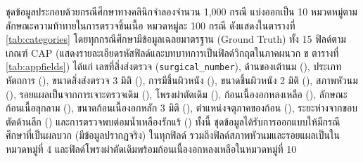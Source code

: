 ชุดข้อมูลประกอบด้วยกรณีศึกษาทางคลินิกจำลองจำนวน 1,000 กรณี แบ่งออกเป็น 10 หมวดหมู่ตามลักษณะความท้าทายในการตรวจชิ้นเนื้อ หมวดหมู่ละ 100 กรณี ดังแสดงในตารางที่ \ref{tab:categories} โดยทุกกรณีศึกษามีข้อมูลเฉลยมาตรฐาน (Ground Truth) ทั้ง 15 ฟิลด์ตามเกณฑ์ CAP \cite{cap_breast} (แสดงรายละเอียดรหัสฟิลด์และบทบาทการเป็นฟิลด์วิกฤตในภาคผนวก ข ตารางที่ \ref{tab:appfields}) ได้แก่ เลขที่สิ่งส่งตรวจ (\texttt{surgical\_number}), ด้านของเต้านม (), ประเภทหัตถการ (), ขนาดสิ่งส่งตรวจ 3 มิติ (), การมีชิ้นผิวหนัง (), ขนาดชิ้นผิวหนัง 2 มิติ (), สภาพหัวนม (), รอยแผลเป็นจากการเจาะตรวจเดิม (), โพรงผ่าตัดเดิม (), ก้อนเนื้องอกหลงเหลือ (), ลักษณะก้อนเนื้อลุกลาม (), ขนาดก้อนเนื้องอกหลัก 3 มิติ (), ตำแหน่งจตุภาคของก้อน (), ระยะห่างจากขอบตัดด้านลึก () และการตรวจพบต่อมน้ำเหลืองรักแร้ () ทั้งนี้ ชุดข้อมูลได้รับการออกแบบให้มีกรณีศึกษาที่เป็นผลบวก (มีข้อมูลปรากฏจริง) ในทุกฟิลด์ รวมถึงฟิลด์สภาพหัวนมและรอยแผลเป็นในหมวดหมู่ที่ 4 และฟิลด์โพรงผ่าตัดเดิมพร้อมก้อนเนื้องอกหลงเหลือในหมวดหมู่ที่ 10


